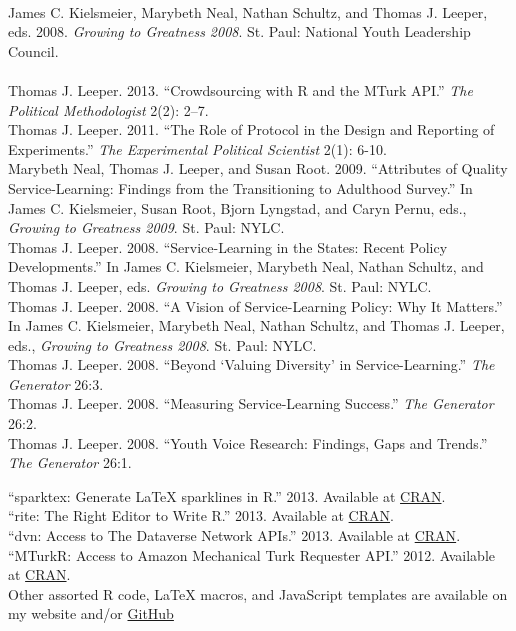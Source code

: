 \documentclass[12pt]{article}
\renewcommand{\section}[1]{\pagebreak[3]%
    \llap{\scshape\smash{\parbox[t]{\marginparwidth}{\raggedright {\color{lg}#1}}}}%
    \vspace{-\baselineskip}\par}
\newcommand{\topic}[1]{\pagebreak[3]\indent {\color{lg}{\footnotesize #1 }}\\}
\newcommand{\entry}[1]{\indent {\color{lg}\guillemotright}\hspace{2pt}#1\vspace{.25em}\\}
\begin{document}

\topic{Edited Volume}
\entry{James C. Kielsmeier, Marybeth Neal, Nathan Schultz, and Thomas J. Leeper, eds. 2008. {\em Growing to Greatness 2008}. St. Paul: National Youth Leadership Council.}

\topic{Other Publications}
\entry{Thomas J. Leeper. 2013. ``Crowdsourcing with R and the MTurk API.'' {\em The Political Methodologist} 2(2): 2--7.}
\entry{Thomas J. Leeper. 2011. ``The Role of Protocol in the Design and Reporting of Experiments.'' {\em The Experimental Political Scientist} 2(1): 6-10.}%
\entry{Marybeth Neal, Thomas J. Leeper, and Susan Root. 2009. ``Attributes of Quality Service-Learning: Findings from the Transitioning to Adulthood Survey.'' In James C. Kielsmeier, Susan Root, Bjorn Lyngstad, and Caryn Pernu, eds., {\em Growing to Greatness 2009}. St. Paul: NYLC.}
\entry{Thomas J. Leeper. 2008. ``Service-Learning in the States: Recent Policy Developments.'' In James C. Kielsmeier, Marybeth Neal, Nathan Schultz, and Thomas J. Leeper, eds. {\em Growing to Greatness 2008}. St. Paul: NYLC.}
\entry{Thomas J. Leeper. 2008. ``A Vision of Service-Learning Policy: Why It Matters.'' In James C. Kielsmeier, Marybeth Neal, Nathan Schultz, and Thomas J. Leeper, eds., {\em Growing to Greatness 2008}. St. Paul: NYLC.}
\entry{Thomas J. Leeper. 2008. ``Beyond `Valuing Diversity' in Service-Learning.'' {\em The Generator} 26:3.}
\entry{Thomas J. Leeper. 2008. ``Measuring Service-Learning Success.'' {\em The Generator} 26:2.}
\entry{Thomas J. Leeper. 2008. ``Youth Voice Research: Findings, Gaps and Trends.'' {\em The Generator} 26:1.}

\section{Software}
\entry{``sparktex: Generate LaTeX sparklines in R.'' 2013. Available at \href{http://cran.r-project.org/web/packages/sparktex/index.html}{CRAN}.}
\entry{``rite: The Right Editor to Write R.'' 2013. Available at \href{http://cran.r-project.org/web/packages/rite/index.html}{CRAN}.}
\entry{``dvn: Access to The Dataverse Network APIs.'' 2013. Available at \href{http://cran.r-project.org/web/packages/dvn/index.html}{CRAN}.}
\entry{``MTurkR: Access to Amazon Mechanical Turk Requester API.'' 2012. Available at \href{http://cran.r-project.org/web/packages/MTurkR/index.html}{CRAN}.}
\entry{Other assorted R code, \LaTeX{} macros, and JavaScript templates are available on my website and/or \href{http://github.com/leeper}{GitHub}}
\end{document}
